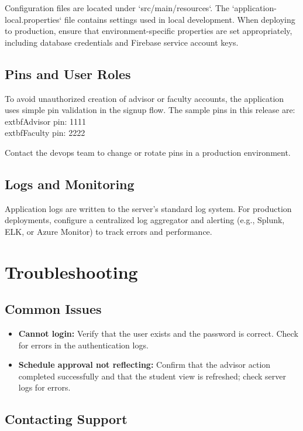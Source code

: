 \documentclass[12pt,letterpaper]{article}
\begin{document}
Configuration files are located under `src/main/resources`. The `application-local.properties` file contains settings used in local development. When deploying to production, ensure that environment-specific properties are set appropriately, including database credentials and Firebase service account keys.

\subsection{Pins and User Roles}

To avoid unauthorized creation of advisor or faculty accounts, the application uses simple pin validation in the signup flow. The sample pins in this release are:\\
	extbf{Advisor pin:} 1111\\
	extbf{Faculty pin:} 2222

Contact the devops team to change or rotate pins in a production environment.

\subsection{Logs and Monitoring}

Application logs are written to the server's standard log system. For production deployments, configure a centralized log aggregator and alerting (e.g., Splunk, ELK, or Azure Monitor) to track errors and performance.

\newpage

\section{Troubleshooting}

\subsection{Common Issues}

\begin{itemize}
    \item \textbf{Cannot login:} Verify that the user exists and the password is correct. Check for errors in the authentication logs.
    \item \textbf{Schedule approval not reflecting:} Confirm that the advisor action completed successfully and that the student view is refreshed; check server logs for errors.
\end{itemize}

\subsection{Contacting Support}
\end{document}
